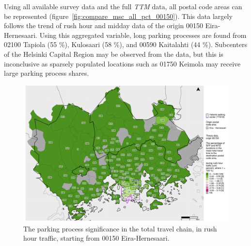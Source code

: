 Using all available survey data and the full \textit{TTM} data, all postal code areas can be represented (figure~\ref{fig:compare_msc_all_pct_00150}). This data largely follows the trend of rush hour and midday data of the origin 00150 Eira-Hernesaari. Using this aggregated variable, long parking processes are found from 02100 Tapiola (55 \%), Kulosaari (58 \%), and 00590 Kaitalahti (44 \%). Subcenters of the Helsinki Capital Region may be observed from the data, but this is inconclusive as sparsely populated locations such as 01750 Keimola may receive large parking process shares.

\begin{figure}[H]%
    \centering
    \includegraphics[trim={0.9cm 0.3cm 0.25cm 0.3cm},clip,width=\textwidth]{images/compare_traveltimes_mapfill-msc_r_pct_fromzip-00150_28-09-2020.png}
    \caption[Parking process significance from Eira-Hernesaari, rush hour traffic]{The parking process significance in the total travel chain, in rush hour traffic, starting from 00150 Eira-Hernesaari.}%
    \label{fig:compare_msc_r_pct_00150}%
\end{figure}

